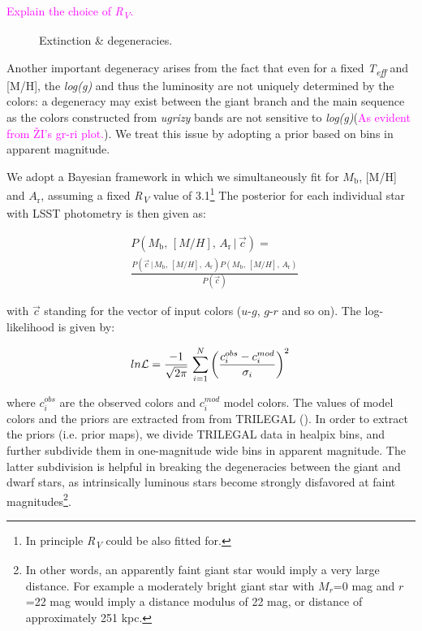 \documentclass[linenumbers, twocolumn, trackchanges]{aastex631}
\newcommand{\magcom}[1]{\textcolor{magenta}{#1}} %
\newcommand{\mh}{[M/H]\xspace}
\newcommand{\Mb}{\ensuremath{M{\mathrm{_b}}}\xspace}
\newcommand{\Ar}{\ensuremath{A{\mathrm{_r}}}\xspace}
\newcommand{\logg}{\textit{log(g)}\xspace}
\newcommand{\teff}{\textit{T\textsubscript{eff}}\xspace}
\newcommand{\RV}{\textit{R\textsubscript{V}}\xspace}
\newcommand{\ul}{\ensuremath{u}\xspace}
\newcommand{\gl}{\ensuremath{g}\xspace}
\newcommand{\rl}{\ensuremath{r}\xspace}
\renewcommand{\arg}[1]{\! \left( #1 \right)}
\newcommand{\Pcond}[2]{P \arg{ #1 \, | \, #2 }}
\begin{document}
\magcom{Explain the choice of \RV.}

\begin{figure}[ht!]
	\caption{Extinction \& degeneracies. \label{fig:degeneracies}}
\end{figure}

Another important degeneracy arises from the fact that even for a fixed \teff and \mh, the \logg and thus the luminosity are not uniquely determined by the colors: a degeneracy may exist between the giant branch and the main sequence as the colors constructed from \textit{ugrizy} bands are not sensitive to \logg (\magcom{As evident from ŽI's gr-ri plot.}). We treat this issue by adopting a prior based on bins in apparent magnitude.

We adopt a Bayesian framework in which we simultaneously fit for \Mb, \mh and \Ar, assuming a fixed \RV value of 3.1\footnote{In principle \RV could be also fitted for.} The posterior for each individual star with LSST photometry is then given as:

\begin{equation} \label{eq:likelihood}
	\begin{split}
		    &\Pcond{\Mb, \, \mh, \, \Ar}{\vec{c}} = \\
		& \frac{\Pcond{\vec{c}}{\Mb, \, \mh, \, \Ar} P\arg{\Mb, \, \mh, \, \Ar}}{P\arg{\vec{c}}} \,
	\end{split}
\end{equation}


with \ensuremath{\vec{c}} standing for the vector of input colors (\ul-\gl, \gl-\rl and so on). The log-likelihood is given by:

\begin{equation}
	ln \mathcal{L} = {-1 \over \sqrt{2\pi}} \,\sum_{i=1}^N \left({ c^{obs}_i - c^{mod}_i  \over \sigma_i } \right)^2 \,
\end{equation}

where \ensuremath{c^{obs}_i} are the observed colors and \ensuremath{c^{mod}_i} model colors. The values of model colors and the priors are extracted from from TRILEGAL (\citet{dal_tio_simulating_2022}). In order to extract the priors (i.e. prior maps), we divide TRILEGAL data in healpix bins, and further subdivide them in one-magnitude wide bins in apparent magnitude. The latter subdivision is helpful in breaking the degeneracies between the giant and dwarf stars, as intrinsically luminous stars become strongly disfavored at faint magnitudes\footnote{In other words, an apparently faint giant star would imply a very large distance. For example a moderately bright giant star with \ensuremath{M_r}=0 mag and \ensuremath{r}=22 mag would imply a distance modulus of 22 mag, or distance of approximately 251 kpc.}.
\end{document}
